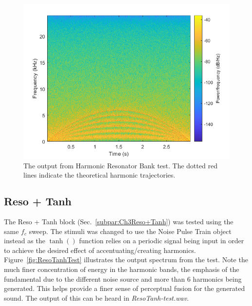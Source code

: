 \documentclass[../main.tex]{subfiles}
\begin{document}
\begin{figure}[h]
    \centering
    \includegraphics[scale=.65]{./images/plots/HRBTest.png}
    \caption{The output from Harmonic Resonator Bank test. The dotted red lines indicate the theoretical harmonic trajectories.}
    \label{fig:HRBTest}
\end{figure}

\subsection{Reso + Tanh}
The Reso + Tanh block (Sec.~\ref{subpar:Ch3Reso+Tanh}) was tested using the same $f_c$ sweep. The stimuli was changed to use the Noise Pulse Train object instead as the $\tanh()$ function relies on a periodic signal being input in order to achieve the desired effect of accentuating/creating harmonics. Figure~\ref{fig:ResoTanhTest} illustrates the output spectrum from the test. Note the much finer concentration of energy in the harmonic bands, the emphasis of the fundamental due to the different noise source and more than 6 harmonics being generated. This helps provide a finer sense of perceptual fusion for the generated sound. The output of this can be heard in \emph{ResoTanh-test.wav}.
\end{document}
